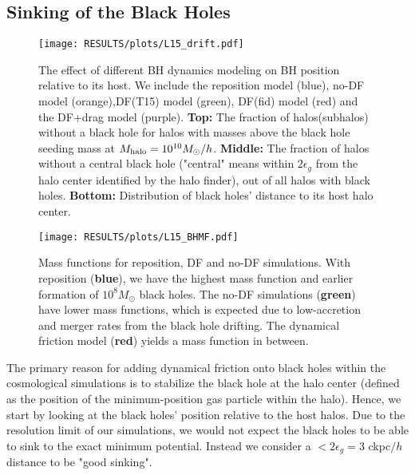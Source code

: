\subsection{Sinking of the Black Holes}
\label{subsec:drift}

\begin{figure}
\texttt{[image: RESULTS/plots/L15\_drift.pdf]}
\caption{The effect of different BH dynamics modeling on BH position relative to its host. We include the reposition model (blue), no-DF model (orange),DF(T15) model (green), DF(fid) model (red) and the DF+drag model (purple). \textbf{Top:} The fraction of halos(subhalos) without a black hole for halos with masses above the black hole seeding mass at $M_{\rm halo} = 10^{10} M_\odot/h$. \textbf{Middle:} The fraction of halos without a central black hole ("central" means within $2\epsilon_g$ from the halo center identified by the halo finder), out of all halos with black holes. \textbf{Bottom:} Distribution of black holes' distance to its host halo center.} 
\label{fig:drift}
\end{figure}


\begin{figure}
\texttt{[image: RESULTS/plots/L15\_BHMF.pdf]}
\caption{Mass functions for reposition, DF and no-DF simulations. With reposition (\textbf{blue}), we have the highest mass function and earlier formation of $10^8 M_\odot$ black holes. The no-DF simulations (\textbf{green}) have lower mass functions, which is expected due to low-accretion and merger rates from the black hole drifting. The dynamical friction model (\textbf{red}) yields a mass function in between.} 
\label{fig:bhmf}
\end{figure}


The primary reason for adding dynamical friction onto black holes within the cosmological simulations is to stabilize the black hole at the halo center (defined as the position of the minimum-position gas particle within the halo). Hence, we start by looking at the black holes' position relative to the host halos. Due to the resolution limit of our simulations, we would not expect the black holes to be able to sink to the exact minimum potential. Instead we consider a $<2\epsilon_g = 3$ ckpc$/h$ distance to be "good sinking".

